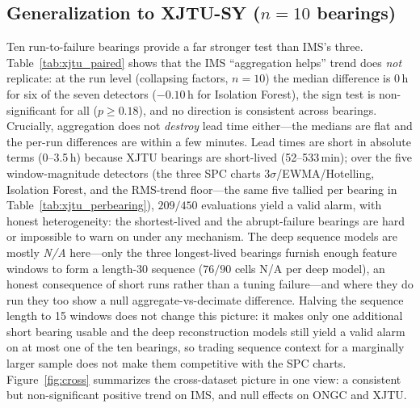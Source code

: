 \documentclass[journal]{IEEEtran}
\begin{document}
\subsection{Generalization to XJTU-SY ($n{=}10$ bearings)}
Ten run-to-failure bearings provide a far stronger test than IMS's three.
Table~\ref{tab:xjtu_paired} shows that the IMS ``aggregation helps'' trend does
\emph{not} replicate: at the run level (collapsing factors, $n{=}10$) the median
difference is $0$\,h for six of the seven detectors ($-0.10$\,h for Isolation
Forest), the sign test is non-significant for
all ($p\ge0.18$), and no direction is consistent across bearings. Crucially,
aggregation does not \emph{destroy} lead time either---the medians are flat and
the per-run differences are within a few minutes. Lead times are short in
absolute terms (0--3.5\,h) because XJTU bearings are short-lived
(52--533\,min); over the five window-magnitude detectors (the three SPC charts
3$\sigma$/EWMA/Hotelling, Isolation Forest, and the RMS-trend floor---the same
five tallied per bearing in Table~\ref{tab:xjtu_perbearing}), $209/450$ evaluations
yield a valid alarm, with honest heterogeneity: the shortest-lived and the
abrupt-failure bearings are hard or impossible to warn on under any mechanism.
The deep sequence models are mostly \emph{N/A} here---only the three
longest-lived bearings furnish enough feature windows to form a length-30
sequence ($76/90$ cells N/A per deep model), an honest consequence of short runs
rather than a tuning failure---and where they do run they too show a null
aggregate-vs-decimate difference. Halving the sequence length to 15 windows does not
change this picture: it makes only one additional short bearing usable and the deep
reconstruction models still yield a valid alarm on at most one of the ten bearings, so
trading sequence context for a marginally larger sample does not make them competitive
with the SPC charts. Figure~\ref{fig:cross} summarizes the
cross-dataset picture in one view: a consistent but non-significant positive
trend on IMS, and null effects on ONGC and XJTU.
\end{document}
